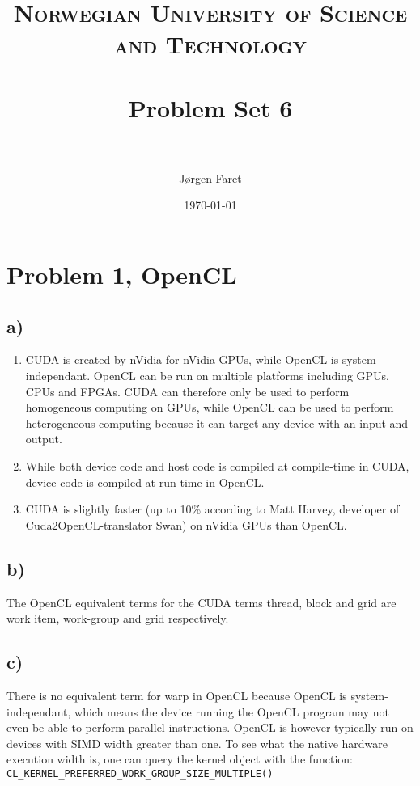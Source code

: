 \documentclass[paper=a4, fontsize=11pt]{scrartcl} %
\title{	
\normalfont \normalsize 
\textsc{Norwegian University of Science and Technology} \\ [25pt] %
\horrule{0.5pt} \\[0.4cm] %
\huge Problem Set 6 \\ %
\horrule{2pt} \\[0.5cm] %
}
\author{J{\o}rgen Faret} %
\date{\normalsize\today} %
\numberwithin{equation}{section} %
\numberwithin{figure}{section} %
\numberwithin{table}{section} %
\begin{document}
\maketitle %

\section{Problem 1, OpenCL}
\subsection{a)}

\begin{enumerate}
\item CUDA is created by nVidia for nVidia GPUs, while OpenCL is system-independant. OpenCL can be run on multiple platforms including GPUs, CPUs and FPGAs. CUDA can therefore only be used to perform homogeneous computing on GPUs, while OpenCL can be used to perform heterogeneous computing because it can target any device with an input and output. 

\item While both device code and host code is compiled at compile-time in CUDA, device code is compiled at run-time in OpenCL.  

\item CUDA is slightly faster (up to 10\% according to Matt Harvey, developer of Cuda2OpenCL-translator Swan) on nVidia GPUs than OpenCL.
\end{enumerate}

\subsection{b)}

The OpenCL equivalent terms for the CUDA terms thread, block and grid are work item, work-group and grid respectively. 

\subsection{c)}

There is no equivalent term for warp in OpenCL because OpenCL is system-independant, which means the device running the OpenCL program may not even be able to perform parallel instructions. OpenCL is however typically run on devices with SIMD width greater than one. To see what the native hardware execution width is, one can query the kernel object with the function:
\verb!CL_KERNEL_PREFERRED_WORK_GROUP_SIZE_MULTIPLE()! 
\end{document}
